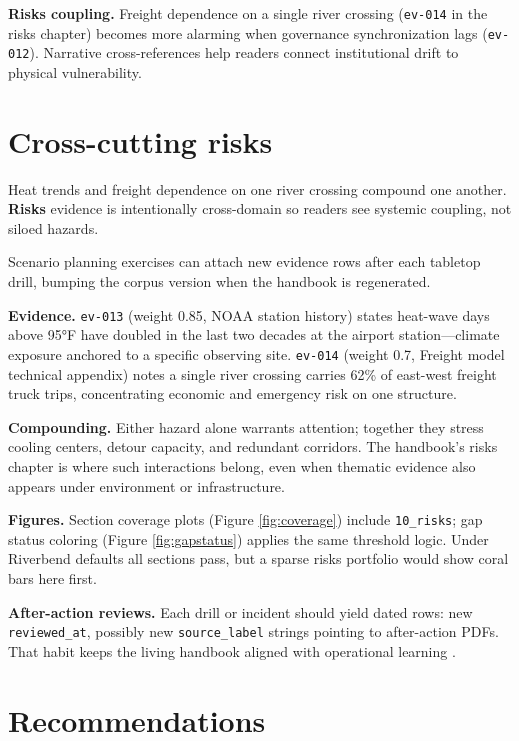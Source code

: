 \documentclass[
]{article}
\begin{document}
\textbf{Risks coupling.} Freight dependence on a single river crossing
(\texttt{ev-014} in the risks chapter) becomes more alarming when
governance synchronization lags (\texttt{ev-012}). Narrative
cross-references help readers connect institutional drift to physical
vulnerability.

\newpage

\section{Cross-cutting risks}\label{cross-cutting-risks}

Heat trends and freight dependence on one river crossing compound one
another. \textbf{Risks} evidence is intentionally cross-domain so
readers see systemic coupling, not siloed hazards.

Scenario planning exercises can attach new evidence rows after each
tabletop drill, bumping the corpus version when the handbook is
regenerated.

\textbf{Evidence.} \texttt{ev-013} (weight 0.85, NOAA station history)
states heat-wave days above 95°F have doubled in the last two decades at
the airport station---climate exposure anchored to a specific observing
site. \texttt{ev-014} (weight 0.7, Freight model technical appendix)
notes a single river crossing carries 62\% of east-west freight truck
trips, concentrating economic and emergency risk on one structure.

\textbf{Compounding.} Either hazard alone warrants attention; together
they stress cooling centers, detour capacity, and redundant corridors.
The handbook's risks chapter is where such interactions belong, even
when thematic evidence also appears under environment or infrastructure.

\textbf{Figures.} Section coverage plots (Figure \ref{fig:coverage})
include \texttt{10\_risks}; gap status coloring (Figure
\ref{fig:gapstatus}) applies the same threshold logic. Under Riverbend
defaults all sections pass, but a sparse risks portfolio would show
coral bars here first.

\textbf{After-action reviews.} Each drill or incident should yield dated
rows: new \texttt{reviewed\_at}, possibly new \texttt{source\_label}
strings pointing to after-action PDFs. That habit keeps the living
handbook aligned with operational learning \citep{template2026}.

\newpage

\section{Recommendations}\label{recommendations}
\end{document}
